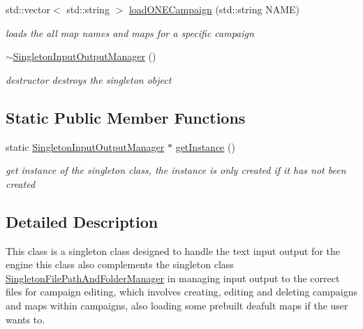 \begin{DoxyCompactItemize}
\hypertarget{class_singleton_input_output_manager_a7117e0cb3797535748bfb3a508b9d44c}{}\label{class_singleton_input_output_manager_a7117e0cb3797535748bfb3a508b9d44c} 
std\+::vector$<$ std\+::string $>$ \hyperlink{class_singleton_input_output_manager_a7117e0cb3797535748bfb3a508b9d44c}{load\+O\+N\+E\+Campaign} (std\+::string N\+A\+ME)
\begin{DoxyCompactList}\small\item\em loads the all map names and maps for a specific campaign \end{DoxyCompactList}\item 
\hypertarget{class_singleton_input_output_manager_ab5fcf578e08c99b964ae784fb4d2dce9}{}\label{class_singleton_input_output_manager_ab5fcf578e08c99b964ae784fb4d2dce9} 
\hyperlink{class_singleton_input_output_manager_ab5fcf578e08c99b964ae784fb4d2dce9}{$\sim$\+Singleton\+Input\+Output\+Manager} ()
\begin{DoxyCompactList}\small\item\em destructor destroys the singleton object \end{DoxyCompactList}\end{DoxyCompactItemize}
\subsection*{Static Public Member Functions}
\begin{DoxyCompactItemize}
\item 
\hypertarget{class_singleton_input_output_manager_ab2dbe239756970b1962fde9aec9b4b14}{}\label{class_singleton_input_output_manager_ab2dbe239756970b1962fde9aec9b4b14} 
static \hyperlink{class_singleton_input_output_manager}{Singleton\+Input\+Output\+Manager} $\ast$ \hyperlink{class_singleton_input_output_manager_ab2dbe239756970b1962fde9aec9b4b14}{get\+Instance} ()
\begin{DoxyCompactList}\small\item\em get instance of the singleton class, the instance is only created if it has not been created \end{DoxyCompactList}\end{DoxyCompactItemize}


\subsection{Detailed Description}
This class is a singleton class designed to handle the text input output for the engine this class also complements the singleton class \hyperlink{class_singleton_file_path_and_folder_manager}{Singleton\+File\+Path\+And\+Folder\+Manager} in managing input output to the correct files for campaign editing, which involves creating, editing and deleting campaigns and maps within campaigns, also loading some prebuilt deafult maps if the user wants to. 

